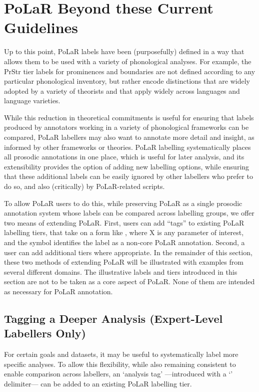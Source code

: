 \documentclass[11pt, twoside]{memoir}
\def\textlabel#1{{\relsize{-.5}\fontspec[Mapping=tex-text]{Roboto Mono}{#1}}}
\begin{document}
\chapter{PoLaR Beyond these Current Guidelines}\label{ch:beyond}
Up to this point, PoLaR labels have been (purposefully) defined in a way that allows them to be used with a variety of phonological analyses. For example, the PrStr tier labels for prominences and boundaries  are not defined according to any particular phonological inventory, but rather encode distinctions that are widely adopted by a variety of theorists and that apply widely across languages and language varieties.

While this reduction in theoretical commitments is useful for ensuring that labels produced by annotators working in a variety of phonological frameworks can be compared, PoLaR labellers may also want to annotate more detail and insight, as informed by other frameworks or theories. PoLaR labelling systematically places all prosodic annotations in one place, which is useful for later analysis, and its extensibility provides the option of adding new labelling options, while ensuring that these additional labels can be easily ignored by other labellers who prefer to do so, and also (critically) by PoLaR-related scripts.

To allow PoLaR users to do this, while preserving PoLaR as a single prosodic annotation system whose labels can be compared across labelling groups, we offer two means of extending PoLaR. First, users can add “tags” to existing PoLaR labelling tiers, that take on a form like \textlabel{\#X}, where X is any parameter of interest, and the \textlabel{\#} symbol identifies the label as a non-core PoLaR annotation. Second, a user can add additional tiers where appropriate. In the remainder of this section, these two methods of extending PoLaR will be illustrated with examples from several different domains. The illustrative labels and tiers introduced in this section are not to be taken as a core aspect of PoLaR. None of them are intended as necessary for PoLaR annotation.

\section{Tagging a Deeper Analysis (Expert-Level Labellers Only)}\label{sec:tagging-a-deeper-analysis-expert-level-labellers-only}

For certain goals and datasets, it may be useful to systematically label more specific analyses. To allow this flexibility, while also remaining consistent to enable comparison across labellers, an ‘analysis tag’ —introduced with a ‘\textlabel{\#}’ delimiter— can be added to an existing PoLaR labelling tier.
\end{document}

